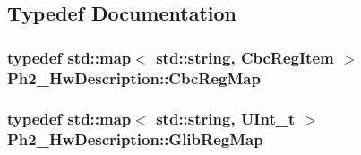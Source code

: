 \subsection{Typedef Documentation}
\hypertarget{namespace_ph2___hw_description_a9a23b373068f169aa67ca1d22c9a6001}{
\subsubsection[{Cbc\-Reg\-Map}]{\setlength{\rightskip}{0pt plus 5cm}typedef std\-::map$<$ std\-::string, {\bf Cbc\-Reg\-Item} $>$ {\bf Ph2\-\_\-\-Hw\-Description\-::\-Cbc\-Reg\-Map}}}\label{namespace_ph2___hw_description_a9a23b373068f169aa67ca1d22c9a6001}
\hypertarget{namespace_ph2___hw_description_a1fd478712d074fa51fc2185802bbfd90}{
\subsubsection[{Glib\-Reg\-Map}]{\setlength{\rightskip}{0pt plus 5cm}typedef std\-::map$<$ std\-::string, U\-Int\-\_\-t $>$ {\bf Ph2\-\_\-\-Hw\-Description\-::\-Glib\-Reg\-Map}}}\label{namespace_ph2___hw_description_a1fd478712d074fa51fc2185802bbfd90}


